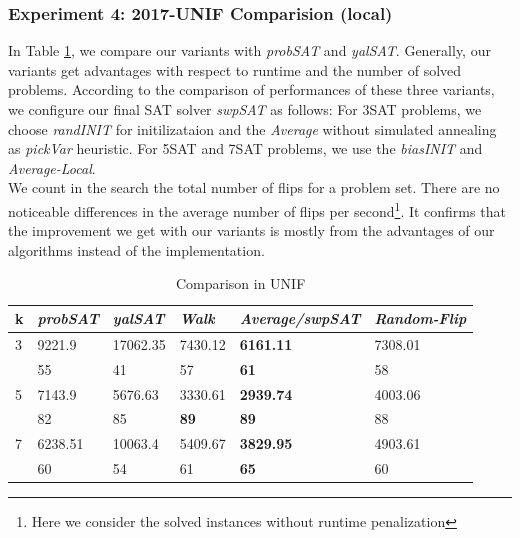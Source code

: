 \documentclass[12pt,a4paper,twoside]{scrartcl}
\numberwithin{equation}{section}
\begin{document}
\subsubsection{Experiment 4: 2017-UNIF Comparision (local)} 
\label{sec:Experiment 4}
In Table \ref{tab:UNIF}, we compare our variants with \emph{probSAT} and \emph{yalSAT}. Generally, our variants get advantages with respect to runtime and the number of solved problems.
According to the comparison of performances of these three variants,  we configure our final SAT solver \emph{swpSAT} as follows: For 3SAT problems, we choose \emph{randINIT} for initilizataion and the \emph{Average} without simulated annealing as \emph{pickVar} heuristic. For 5SAT and 7SAT problems, we use the \emph{biasINIT} and \emph{Average-Local}.  \\
We count in the search the total number of flips for a problem set. There are no noticeable differences in the average number of flips per second\footnote{Here we consider the solved instances without runtime penalization}. It confirms that the improvement we get with our variants is mostly from the advantages of our algorithms instead of the implementation.
   \begin{table}[H]
   \label{tab:UNIF}
\begin{center}
    \begin{tabular}{|l|l|l|l|l|p{3cm}|}
\hline 

    k &\emph{probSAT}&\emph{yalSAT}&\emph{Walk}&\emph{Average/swpSAT}&\emph{Random-Flip} \\ \hline      
    3 &9221.9&17062.35&7430.12&\textbf{6161.11} &7308.01\\ 
    &55&41&57&\textbf{61}&58\\ \hline
    5& 7143.9&5676.63&3330.61&\textbf{2939.74}&4003.06\\ 
    &82&85&\textbf{89}&\textbf{89}&88\\ \hline
    7& 6238.51&10063.4&5409.67&\textbf{3829.95}&4903.61\\
    &60&54&61&\textbf{65}&60\\ \hline
\end{tabular}
\end{center}
\caption{Comparison in UNIF}
\end{table}
\end{document}
